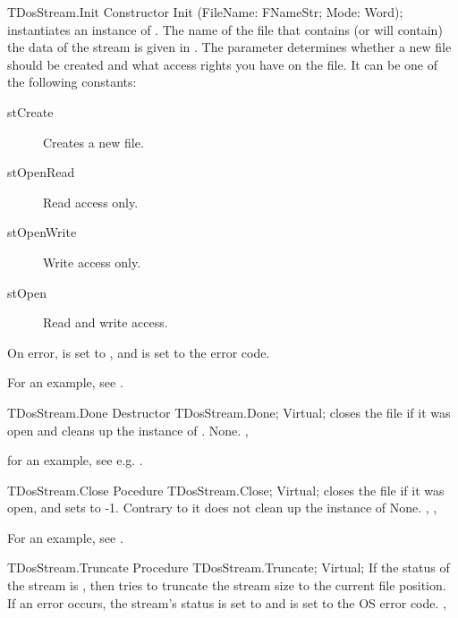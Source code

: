 \begin{procedure}{TDosStream.Init}
\Declaration
Constructor Init (FileName: FNameStr; Mode: Word);
\Description
{} instantiates an instance of . The name of the 
file that contains (or will contain) the data of the stream is given in
. The  parameter determines whether a new file 
should be created and what access rights you have on the file. 
It can be one of the following constants:
\begin{description}
\item[stCreate] Creates a new file.
\item[stOpenRead] Read access only.
\item[stOpenWrite] Write access only.
\item[stOpen] Read and write access.
\end{description}
\Errors
On error,  is set to , and 
is set to the \dos error code.
\SeeAlso
{}
\end{procedure}

For an example, see .

\begin{procedure}{TDosStream.Done}
\Declaration
Destructor TDosStream.Done; Virtual;
\Description
{} closes the file if it was open and cleans up the 
instance of . 
\Errors
None.
\SeeAlso
{},
\end{procedure}

for an example, see e.g. .

\begin{procedure}{TDosStream.Close}
\Declaration
Pocedure TDosStream.Close; Virtual;
\Description
{} closes the file if it was open, and sets  to -1. 
Contrary to  it does not clean up the instance
of 
\Errors
None.
\SeeAlso
{}, ,
\end{procedure}

For an example, see .

\begin{procedure}{TDosStream.Truncate}
\Declaration
Procedure TDosStream.Truncate; Virtual;
\Description
If the status of the stream is , then  tries to
truncate the stream size to the current file position.
\Errors
If an error occurs, the stream's status is set to  and
 is set to the OS error code.
\SeeAlso
{}, 
\end{procedure}


